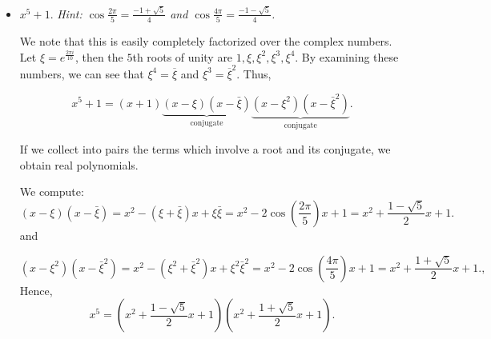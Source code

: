 \documentclass[11pt,dvipsnames]{book}
\numberwithin{equation}{section} %
\numberwithin{figure}{section} %
\numberwithin{table}{section} %
\begin{document}
\begin{exercise}
\begin{itemize}
\item $x^5+1$. {\it Hint: $\cos \frac{2\pi}{5}= \frac{-1+\sqrt{5}}{4}$ and $\cos \frac{4\pi}{5}= \frac{-1-\sqrt{5}}{4}$.}

\begin{solution}
We note that this is easily completely factorized over the complex numbers.  Let $\xi = e^{\frac{2\pi i}{10}}$, then the $5$th roots of unity are $1,\xi,\xi^2, \xi^3,\xi^4$. By examining these numbers, we can see that $\xi^{4}=\overline{\xi}$ and $\xi^{3} = \overline{\xi}^{2}$.  Thus, 

$$x^5+1 = (x+1)\underbrace{(x-\xi)(x-\bar{\xi})}_{\textrm{conjugate}}\underbrace{(x-\xi^2)(x-\bar{\xi}^2)}_{\textrm{conjugate}}.$$

If we collect into pairs the terms which involve a root and its conjugate, we obtain real polynomials.

We compute:
$$(x-\xi)(x-\bar{\xi}) = x^2 - (\xi+\bar{\xi})x + \xi\bar{\xi} = x^2 - 2\cos(\frac{2\pi}{5})x+1 
= x^2 +\frac{1-\sqrt{5}}{2}x+1.
$$ 
and 

$$(x-\xi^2)(x-\bar{\xi}^2) = x^2 -(\xi^2 + \bar{\xi}^2)x + \xi^2\bar{\xi}^2 = x^2 - 2\cos(\frac{4\pi}{5})x+1
= x^2 +\frac{1+\sqrt{5}}{2}x+1.
,$$
Hence,
\[
x^5 = \left(x^2 +\frac{1-\sqrt{5}}{2}x+1\right) \left(x^2 +\frac{1+\sqrt{5}}{2}x+1\right).
\]
\end{solution}



\end{itemize}
\end{exercise}
\end{document}
